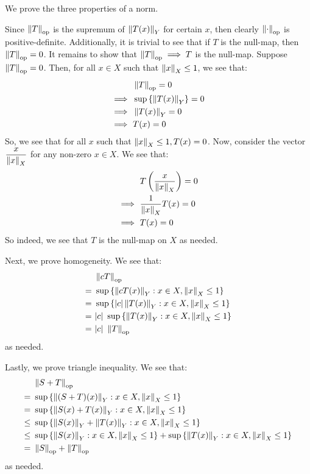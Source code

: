 \begin{soln}
    We prove the three properties of a norm. \npgh

    Since $ \left\|T\right\|_{\textrm{op}} $ is the supremum of $ \left\|T(x)\right\|_{Y} $ for
    certain $ x $, then clearly $ \left\|\cdot\right\|_{\textrm{op}} $ is positive-definite.
    Additionally, it is trivial to see that if $ T $ is the null-map,
    then $ \left\|T\right\|_{\textrm{op}} = 0 $.
    It remains to show that $ \left\|T\right\|_{\textrm{op}} \implies T $ is the null-map.
    \vsp
    Suppose $ \left\|T\right\|_{\textrm{op}} = 0 $.
    Then, for all $ x \in X $ such that $ \left\|x\right\|_{X} \leq 1 $, we see that:
    \begin{align*}
        & \left\|T\right\|_{\textrm{op}} = 0 \\
        \implies \ & \sup \left\{{\left\|T(x)\right\|_{Y}}\right\} = 0 \\
        \implies \ & \left\|T(x)\right\|_{Y} = 0 \\
        \implies \ & T(x) = 0
    \end{align*}
    So, we see that for all $ x $ such that $ \left\|x\right\|_{X} \leq 1, T(x) = 0 $.
    Now, consider the vector $ \dfrac{x}{\left\|x\right\|_{X}} $ for any non-zero $ x \in
    X $. We see that:
    \begin{align*}
        & T \left( \frac{x}{\left\|x\right\|_{X}} \right) = 0 \\
        \implies \ & \frac{1}{\left\|x\right\|_{X}} T(x) = 0 \\
        \implies \ & T(x) = 0
    \end{align*}
    So indeed, we see that $ T $ is the null-map on $ X $ as needed. \npgh

    Next, we prove homogeneity. We see that:
    \begin{align*}
        & \left\|cT\right\|_{\textrm{op}} \\
        = \ & \sup \left\{{\left\|cT(x)\right\|_{Y} : x \in X, \left\|x\right\|_{X} \leq 1}\right\} \\
        = \ & \sup \left\{{\abs{c}\left\|T(x)\right\|_{Y} : x \in X, \left\|x\right\|_{X} \leq 1}\right\} \\
        = \ & \abs{c} \ \sup \left\{{\left\|T(x)\right\|_{Y} : x \in X, \left\|x\right\|_{X}
        \leq 1}\right\} \\
        = \ & \abs{c} \ \left\|T\right\|_{\textrm{op}}
    \end{align*}
    as needed. \npgh

    Lastly, we prove triangle inequality. We see that:
    \begin{align*}
        & \left\|S + T\right\|_{\textrm{op}} \\
        = \ & \sup \left\{{\left\|(S + T)(x)\right\|_{Y} : x \in X, \left\|x\right\|_{X} \leq 1}\right\} \\
        = \ & \sup \left\{{\left\|S(x) + T(x)\right\|_{Y} : x \in X, \left\|x\right\|_{X} \leq 1}\right\} \\
        \leq \ & \sup \left\{{\left\|S(x)\right\|_{Y} + \left\|T(x)\right\|_{Y} : x \in X,
        \left\|x\right\|_{X} \leq 1}\right\} \\
        \leq \ & \sup \left\{{\left\|S(x)\right\|_{Y} : x \in X, \left\|x\right\|_{X} \leq 1}\right\} +
        \sup \left\{{\left\|T(x)\right\|_{Y} : x \in X, \left\|x\right\|_{X} \leq 1}\right\} \\
        = \ & \left\|S\right\|_{\textrm{op}} + \left\|T\right\|_{\textrm{op}}
    \end{align*}
    as needed. \npgh


\end{soln}
